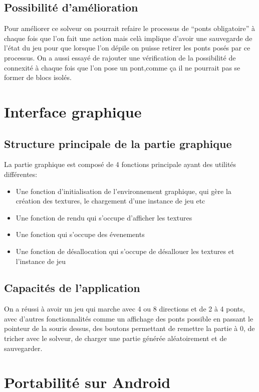 \documentclass[12pt]{report}
\begin{document}
\section{Possibilité d'amélioration}
Pour améliorer ce solveur on pourrait refaire le processus de ``ponts obligatoire'' à chaque fois que l'on fait une action mais celà implique d'avoir une sauvegarde de l'état du jeu pour que lorsque l'on dépile on puisse retirer les ponts posés par ce processus. On a aussi essayé de rajouter une vérification de la possibilité de connexité à chaque fois que l'on pose un pont,comme ça il ne pourrait pas se former de blocs isolés.

\chapter{Interface graphique}
\section{Structure principale de la partie graphique}
La partie graphique est composé de 4 fonctions principale ayant des utilités différentes:
\begin{itemize}
\item Une fonction d'initialisation de l'environnement graphique, qui gère la création des textures, le chargement d'une instance de jeu etc
\item Une fonction de rendu qui s'occupe d'afficher les textures
\item Une fonction qui s'occupe des évenements
\item Une fonction de désallocation qui s'occupe de désallouer les textures et l'instance de jeu
\end{itemize}

\section{Capacités de l'application}
On a réussi à avoir un jeu qui marche avec 4 ou 8 directions et de 2 à 4 ponts, avec d'autres fonctionnalités comme un affichage des ponts possible en passant le pointeur de la souris dessus, des boutons permettant de remettre la partie à 0, de tricher avec le solveur, de charger une partie générée aléatoirement et de sauvegarder.

\chapter{Portabilité sur Android}
\end{document}
